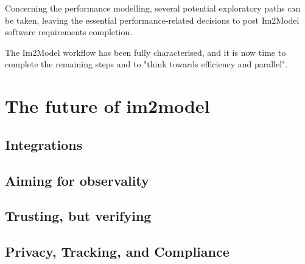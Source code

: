 \documentclass[
  oneside,
  11pt, a4paper,
  footinclude=true,
  headinclude=true,
  cleardoublepage=empty
]{scrbook}
\begin{document}
Concerning the performance modelling, several potential exploratory
paths can be taken, leaving the essential performance-related decisions to post Im2Model software requirements completion.\par 

The Im2Model workflow has been fully characterised, and it is now time to complete the remaining steps and to "think towards efficiency and parallel".


		    \section{The future of im2model}
		    
		     \subsection{Integrations}
		     
		      \subsection{Aiming for observality}
		      
		      \subsection{Trusting, but verifying}
		      
		      \subsection{Privacy, Tracking, and Compliance}


	

	
	
	

\end{document}

